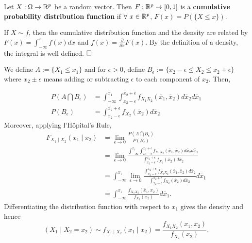        \begin{definition} Let $X : \Omega \to \mathbb R^p$ be a random vector. Then $F: \mathbb R^p \to [0, 1]$ is a \textbf{cumulative probability distribution function} if $\forall~x\in \mathbb R^p$, $F(x) = P(\{ X \le x\})$.
       \end{definition}
       
       \begin{rem}
              If $X\sim f$, then the cumulative distribution function and the density are related by $F(x) = \int_{-\infty}^{x} f(x) dx$ and $f(x) = \frac{\partial}{\partial x} F(x)$. By the definition of a density, the integral is well defined. 
             $\hfill \square$  \end{rem}
       
      We define $A:=\{X_1 \le x_1 \}$ and for $\epsilon >0$, define $B_\epsilon:=\{x_2 - \epsilon \le X_2 \le x_2+\epsilon \}$ where $x_2\pm \epsilon$ means adding or subtracting $\epsilon$ to each component of $x_2$. Then,

\begin{align*}
P(A\bigcap B_{\epsilon})&=\int^{x_1}_{-\infty}\int^{x_2+\epsilon}_{x_2-\epsilon}f_{X_1X_2}(\bar{x}_1,\bar{x}_2)d\bar{x}_2d\bar{x}_1 \\
        P(B_{\epsilon})&=\int^{x_2+\epsilon}_{x_2-\epsilon}f_{X_2}(\bar{x}_2)d\bar{x}_2 
\end{align*}
Moreover, applying l'H\^{o}pital's Rule, 
\begin{align*}
        F_{X_1 \mid X_2}(x_1\mid x_2) &= \lim_{\epsilon \to 0}\frac{P(A\bigcap B_{\epsilon})}{P(B_{\epsilon})} \\
        &=\lim_{\epsilon \to 0}\frac{\int^{x_1}_{-\infty}\int^{x_2+\epsilon}_{x_2-\epsilon}f_{X_1X_2}(\bar{x}_1,\bar{x}_2)d\bar{x}_2d\bar{x}_1}
        {\int^{x_2+\epsilon}_{x_2-\epsilon}f_{X_2}(\bar{x}_2)d\bar{x}_2}\\
        &=\int^{x_1}_{-\infty}\lim_{\epsilon \to 0}\frac{\int^{x_2+\epsilon}_{x_2-\epsilon}f_{X_1X_2}(\bar{x}_1,\bar{x}_2)d\bar{x}_2}
        {\int^{x_2+\epsilon}_{x_2-\epsilon}f_{X_2}(\bar{x}_2)d\bar{x}_2} d\bar{x}_1\\
        &= \int^{x_1}_{-\infty} \frac{f_{X_1X_2}(\bar{x}_1,{x}_2)}{f_{X_2}({x}_2)} d\bar{x}_1.
\end{align*}
Differentiating the distribution function with respect to $x_1$ gives the density and hence
$$\left(  X_1\mid X_2=x_2 \right) \sim f_{X_1\mid X_2}(x_1 \mid x_2) = \frac{f_{X_1X_2}({x}_1,{x}_2)}{f_{X_2}({x}_2)}.$$


